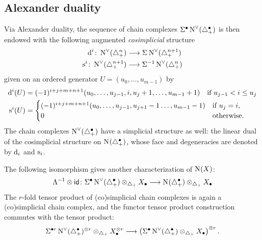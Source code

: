 \subsection{Alexander duality}
Via Alexander duality, the sequence of chain complexes $\Sigma^{\bullet }\operatorname{N}^\vee_{}(\triangle_{+}^\bullet)$ is then endowed with the following augmented \emph{cosimplicial} structure
\begin{align*}
	\operatorname{d}^i \colon \operatorname{N}^\vee_{}(\triangle_{+}^n) & \longrightarrow \Sigma^{}\operatorname{N}^\vee_{}(\triangle_{+}^{n+1})
	\\
	\operatorname{s}^i \colon \operatorname{N}^\vee_{}(\triangle_{+}^{n+1}) & \longrightarrow \Sigma^{-1}\operatorname{N}^\vee_{}(\triangle_{+}^n)
\end{align*}
given on an ordered generator $U=(u_0,\dots,u_{m-1})$ by
\begin{align*}
	\operatorname{d}^i(U) &=
	(-1)^{i+j+m+n+1}(u_0,\dots,u_{j-1},i,u_{j}+1,\dots,u_{m-1}+1)
	\quad \text{if $u_{j-1}<i \leq u_{j}$}
	\\
	\operatorname{s}^i(U) &= \begin{cases}
	(-1)^{i+j+m+n+1}(u_0,\dots,u_{j-1},u_{j+1}-1\dots,u_{m-1}-1) & \text{if $u_{j} = i$,}
	\\
	0 & \text{otherwise.}
	\end{cases}
\end{align*} %
 The chain complexes $\operatorname{N}^\vee_{}(\triangle_{+}^\bullet)$ have a simplicial structure as well: the linear dual of the cosimplicial structure on $\operatorname{N}_{}(\triangle_{+}^\bullet)$, whose face and degeneracies are denoted by $\operatorname{d}_i$ and $\operatorname{s}_i$.
 
The following isomorphism gives another characterization of $\operatorname{N}_{}(X)$:
\begin{equation}\label{eq:dual}
	\Lambda^{-1} \otimes \mathsf{id}\colon \Sigma^{\bullet }\operatorname{N}^\vee_{}(\triangle_{+}^\bullet)\otimes_{\triangle_{+}} X_\bullet
	\longrightarrow
	\operatorname{N}_{}(\triangle_{+}^{\bullet})\otimes_{\triangle_{+}} X_\bullet
\end{equation}
The $r$-fold tensor product of (co)simplicial chain complexes is again a (co)simplicial chain complex, and the functor tensor product construction commutes with the tensor product:
\begin{equation}\label{eq:assemble}
	\Sigma^{\bullet r}\operatorname{N}^\vee_{}(\triangle_{+}^\bullet)^{\otimes r}\otimes_{\triangle_{+}} X^{\otimes r}_\bullet 
	\longrightarrow 
	\left(\Sigma^{\bullet }\operatorname{N}^\vee_{}(\triangle_{+}^\bullet)\otimes_{\triangle_{+}} X_\bullet \right)^{\otimes r}.
\end{equation}

